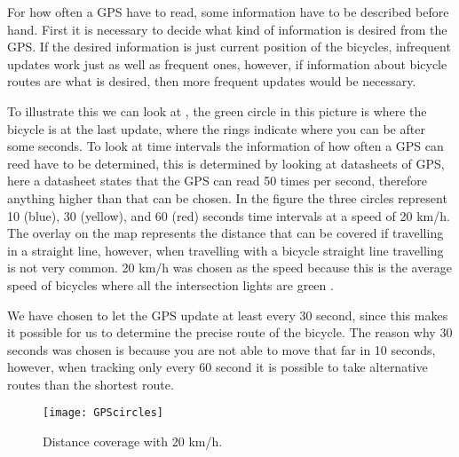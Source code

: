 \begin{description}[style=nextline]
\item[Problem 1.3]
For how often a GPS have to read, some information have to be described before hand.
First it is necessary to decide what kind of information is desired from the GPS.
If the desired information is just current position of the bicycles, infrequent updates work just as well as frequent ones, however, if information about bicycle routes are what is desired, then more frequent updates would be necessary.

To illustrate this we can look at , the green circle in this picture is where the bicycle is at the last update, where the rings indicate where you can be after some seconds.
To look at time intervals the information of how often a GPS can reed have to be determined, this is determined by looking at datasheets of GPS, here a datasheet \citep{manual:gpsDataSheet} states that the GPS can read 50 times per second, therefore anything higher than that can be chosen.
In the figure the three circles represent 10 (blue), 30  (yellow), and 60 (red) seconds time intervals at a speed of 20 km/h.
The overlay on the map represents the distance that can be covered if travelling in a straight line, however, when travelling with a bicycle straight line travelling is not very common.
20 km/h was chosen as the speed because this is the average speed of bicycles where all the intersection lights are green \citep{misc:bicycleStatistics}.

We have chosen to let the GPS update at least every 30 second, since this makes it possible for us to determine the precise route of the bicycle.
The reason why 30 seconds was chosen is because you are not able to move that far in 10 seconds, however, when tracking only every 60 second it is possible to take alternative routes than the shortest route.


\begin{figure}
	\centering
	\texttt{[image: GPScircles]}
	\caption{Distance coverage with 20 km/h.}
	\label{fig:gpsCircles}
\end{figure}
\end{description}

